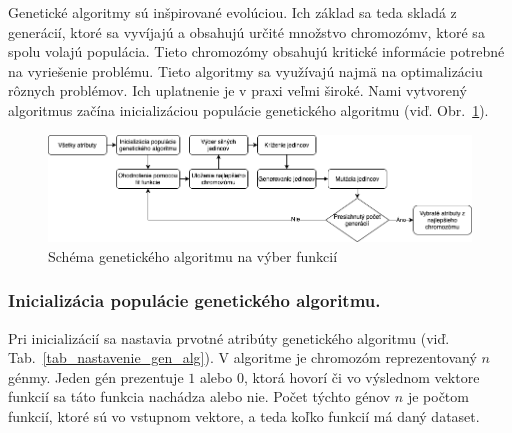 \documentclass[runningheads]{llncs}
\begin{document}
Genetické algoritmy sú inšpirované evolúciou. Ich základ sa teda skladá z generácií, ktoré sa vyvíjajú a obsahujú 
určité množstvo chromozómv, ktoré sa spolu volajú populácia. Tieto chromozómy obsahujú kritické informácie 
potrebné na vyriešenie problému. Tieto algoritmy sa využívajú najmä na optimalizáciu rôznych
problémov. Ich uplatnenie je v praxi veľmi široké.\cite{ref_babatunde,ref_whitley} Nami vytvorený algoritmus začína 
inicializáciou populácie genetického algoritmu (viď. Obr.~\ref{fig_ga_rozdelenie}).
\begin{figure}
\includegraphics[width=\textwidth]{image/GA_alg.png}
\caption{Schéma genetického algoritmu na výber funkcií} \label{fig_ga_rozdelenie}
\end{figure}
    
\subsubsection{Inicializácia populácie genetického algoritmu.}

Pri inicializácií sa nastavia prvotné atribúty genetického algoritmu (viď. Tab.~\ref{tab_nastavenie_gen_alg}). 
V algoritme je chromozóm reprezentovaný \begin{math}n\end{math} génmy. Jeden gén prezentuje \begin{math}1\end{math} 
alebo \begin{math}0\end{math}, ktorá hovorí či vo výslednom vektore funkcií sa táto funkcia nachádza alebo nie. 
Počet týchto génov \begin{math}n\end{math} je počtom funkcií, ktoré sú vo vstupnom vektore, a teda 
koľko funkcií má daný dataset.
\end{document}
